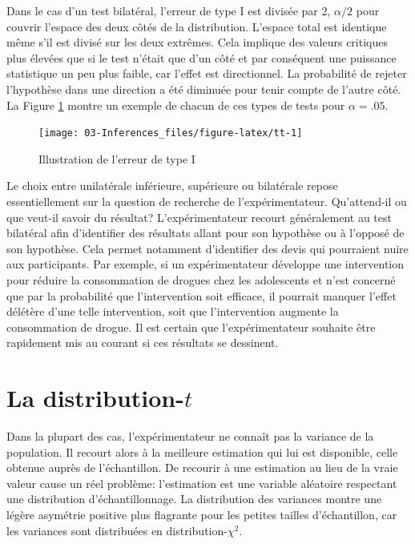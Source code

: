 \documentclass[
]{book}
\begin{document}
Dans le cas d'un test bilatéral, l'erreur de type I est divisée par 2, \(\alpha/2\) pour couvrir l'espace des deux côtés de la distribution. L'espace total est identique même s'il est divisé sur les deux extrêmes. Cela implique des valeurs critiques plus élevées que si le test n'était que d'un côté et par conséquent une puissance statistique un peu plus faible, car l'effet est directionnel. La probabilité de rejeter l'hypothèse dans une direction a été diminuée pour tenir compte de l'autre côté. La Figure \ref{fig:tt} montre un exemple de chacun de ces types de tests pour \(\alpha = .05\).

\begin{figure}

{\centering \texttt{[image: 03-Inferences\_files/figure-latex/tt-1]} 

}

\caption{Illustration de l'erreur de type I}\label{fig:tt}
\end{figure}

Le choix entre unilatérale inférieure, supérieure ou bilatérale repose essentiellement sur la question de recherche de l'expérimentateur. Qu'attend-il ou que veut-il savoir du résultat? L'expérimentateur recourt généralement au test bilatéral afin d'identifier des résultats allant pour son hypothèse ou à l'opposé de son hypothèse. Cela permet notamment d'identifier des devis qui pourraient nuire aux participants. Par exemple, si un expérimentateur développe une intervention pour réduire la consommation de drogues chez les adolescents et n'est concerné que par la probabilité que l'intervention soit efficace, il pourrait manquer l'effet délétère d'une telle intervention, soit que l'intervention augmente la consommation de drogue. Il est certain que l'expérimentateur souhaite être rapidement mis au courant si ces résultats se dessinent.

\hypertarget{la-distribution-t}{%
\section{\texorpdfstring{La distribution-\(t\)}{La distribution-t}}\label{la-distribution-t}}

Dans la plupart des cas, l'expérimentateur ne connaît pas la variance de la population. Il recourt alors à la meilleure estimation qui lui est disponible, celle obtenue auprès de l'échantillon. De recourir à une estimation au lieu de la vraie valeur cause un réel problème: l'estimation est une variable aléatoire respectant une distribution d'échantillonnage. La distribution des variances montre une légère asymétrie positive plus flagrante pour les petites tailles d'échantillon, car les variances sont distribuées en distribution-\(\chi^2\).
\end{document}
